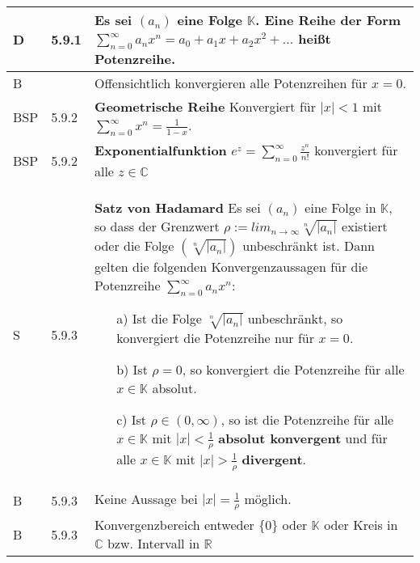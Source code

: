     \begin{longtable}{p{0.75cm} p{1cm} p{16cm}}
        \toprule

        D   & 5.9.1 &   Es sei $(a_n)$ eine Folge $\mathbb{K}$. Eine Reihe der Form $\sum^{\infty}_{n=0} a_n x^n = a_0 + a_1x+a_2x^2+ \dots$ 
                        heißt \textbf{Potenzreihe}. \\
        \midrule
        B   &       &   Offensichtlich konvergieren alle Potenzreihen für $x = 0$. \\
        \midrule
        BSP & 5.9.2 &   \textbf{Geometrische Reihe} \hfill \break 
                        Konvergiert für $|x| < 1$ mit $\sum^{\infty}_{n=0} x^n = \frac{1}{1-x}$. \\
        \midrule
        BSP & 5.9.2 &   \textbf{Exponentialfunktion} \hfill \break
                        $e^z = \sum^{\infty}_{n=0} \frac{z^n}{n!}$ konvergiert für alle $z \in \mathbb{C}$ \\ 
        \midrule
        S   & 5.9.3 &   \textbf{Satz von Hadamard} \hfill \break
                        Es sei $(a_n)$ eine Folge in $\mathbb{K}$, so dass der Grenzwert $\rho := lim_{n \rightarrow \infty} \sqrt[n]{|a_n|}$ existiert
                        oder die Folge $(\sqrt[n]{|a_n|})$ unbeschränkt ist. Dann gelten die folgenden Konvergenzaussagen für die Potenzreihe 
                        $\sum^{\infty}_{n=0} a_n x^n$:
                        \begin{itemize}[topsep=-0.5cm]
                            \item[a)] Ist die Folge $\sqrt[n]{|a_n|}$ unbeschränkt, so konvergiert die Potenzreihe nur für \textbf{$x = 0$}.
                            \item[b)] Ist $\rho = 0$, so konvergiert die Potenzreihe für alle $x \in \mathbb{K}$ absolut. 
                            \item[c)] Ist $\rho \in (0, \infty)$, so ist die Potenzreihe für alle $x \in \mathbb{K}$ mit $|x|< \frac{1}{\rho}$
                                        \textbf{absolut konvergent} und für alle $x \in \mathbb{K}$ mit $|x| > \frac{1}{\rho}$ \textbf{divergent}.
                        \end{itemize} \vspace{-0cm} \\
        \midrule
        B   & 5.9.3 &   Keine Aussage bei $|x|=\frac{1}{\rho}$ möglich. \\
        \midrule
        B   & 5.9.3 &   Konvergenzbereich entweder $\{0\}$ oder $\mathbb{K}$ oder Kreis in $\mathbb{C}$ bzw. Intervall in $\mathbb{R}$ \\

\end{longtable}
